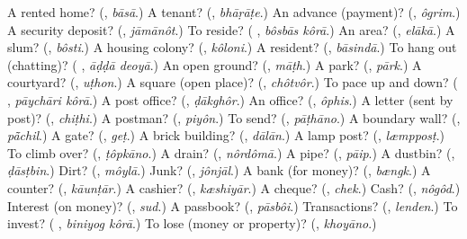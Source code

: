 \begin{tcolorbox}[breakable,colback=teal!4,colframe=teal!35!black,title={Before you move on}]
A rented home? (\textbf{}, \emph{bāsā}.) A tenant? (\textbf{}, \emph{bhāṛāṭe}.) An advance (payment)? (\textbf{}, \emph{ôgrim}.) A security deposit? (\textbf{}, \emph{jāmānôt}.) To reside? (\textbf{ }, \emph{bôsbās kôrā}.) An area? (\textbf{}, \emph{elākā}.) A slum? (\textbf{}, \emph{bôsti}.) A housing colony? (\textbf{}, \emph{kôloni}.) A resident? (\textbf{}, \emph{bāsindā}.) To hang out (chatting)? (\textbf{ }, \emph{āḍḍā deoyā}.) An open ground? (\textbf{}, \emph{māṭh}.) A park? (\textbf{}, \emph{pārk}.) A courtyard? (\textbf{}, \emph{uṭhon}.) A square (open place)? (\textbf{}, \emph{chôtvôr}.) To pace up and down? (\textbf{ }, \emph{pāychāri kôrā}.) A post office? (\textbf{}, \emph{ḍākghôr}.) An office? (\textbf{}, \emph{ôphis}.) A letter (sent by post)? (\textbf{}, \emph{chiṭhi}.) A postman? (\textbf{}, \emph{piyôn}.) To send? (\textbf{}, \emph{pāṭhāno}.) A boundary wall? (\textbf{}, \emph{pā̃chil}.) A gate? (\textbf{}, \emph{geṭ}.) A brick building? (\textbf{}, \emph{dālān}.) A lamp post? (\textbf{}, \emph{læmpposṭ}.) To climb over? (\textbf{}, \emph{ṭôpkāno}.) A drain? (\textbf{}, \emph{nôrdômā}.) A pipe? (\textbf{}, \emph{pāip}.) A dustbin? (\textbf{}, \emph{ḍāsṭbin}.) Dirt? (\textbf{}, \emph{môylā}.) Junk? (\textbf{}, \emph{jônjāl}.) A bank (for money)? (\textbf{}, \emph{bængk}.) A counter? (\textbf{}, \emph{kāunṭār}.) A cashier? (\textbf{}, \emph{kæshiyār}.) A cheque? (\textbf{}, \emph{chek}.) Cash? (\textbf{}, \emph{nôgôd}.) Interest (on money)? (\textbf{}, \emph{sud}.) A passbook? (\textbf{}, \emph{pāsbôi}.) Transactions? (\textbf{}, \emph{lenden}.) To invest? (\textbf{ }, \emph{biniyog kôrā}.) To lose (money or property)? (\textbf{}, \emph{khoyāno}.)
\end{tcolorbox}
